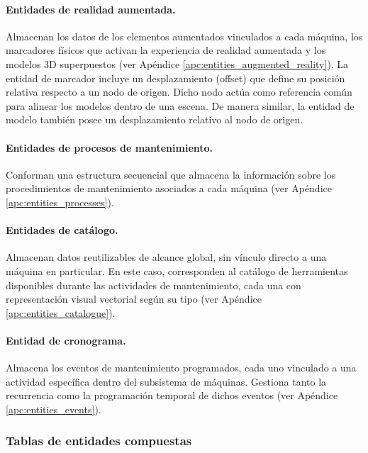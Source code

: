             \paragraph{Entidades de realidad aumentada.}
            
                Almacenan los datos de los elementos aumentados vinculados a cada máquina, los marcadores físicos que activan la experiencia de realidad aumentada y los modelos 3D superpuestos (ver Apéndice \ref{apc:entities_augmented_reality}). La entidad de marcador incluye un desplazamiento (offset) que define su posición relativa respecto a un nodo de origen. Dicho nodo actúa como referencia común para alinear los modelos dentro de una escena. De manera similar, la entidad de modelo también posee un desplazamiento relativo al nodo de origen.

            \paragraph{Entidades de procesos de mantenimiento.}
            
                Conforman una estructura secuencial que almacena la información sobre los procedimientos de mantenimiento asociados a cada máquina (ver Apéndice \ref{apc:entities_processes}).

            \paragraph{Entidades de catálogo.}
            
                Almacenan datos reutilizables de alcance global, sin vínculo directo a una máquina en particular. En este caso, corresponden al catálogo de herramientas disponibles durante las actividades de mantenimiento, cada una con representación visual vectorial según su tipo (ver Apéndice \ref{apc:entities_catalogue}).

            \paragraph{Entidad de cronograma.}
                
                Almacena los eventos de mantenimiento programados, cada uno vinculado a una actividad específica dentro del subsistema de máquinas. Gestiona tanto la recurrencia como la programación temporal de dichos eventos (ver Apéndice \ref{apc:entities_events}).

        \subsubsection{Tablas de entidades compuestas}

